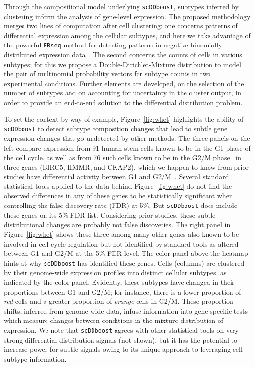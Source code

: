 \documentclass[aoas,preprint]{imsart}
\begin{document}
Through the compositional model underlying \verb+scDDboost+, subtypes inferred by clustering 
inform the analysis of gene-level expression.  The proposed methodology merges two lines of computation
after cell clustering: one concerns patterns of differential expression among 
the cellular subtypes, and here we take advantage of the powerful \verb+EBseq+ method for detecting
patterns in negative-binomially-distributed expression data~\citep{oscope}.  The second concerns 
the counts of cells in various subtypes; for this we propose a Double-Dirichlet-Mixture distribution
to model the pair of multinomial probability vectors for subtype counts in two experimental conditions.
Further elements are developed, on the selection of the number of subtypes and on accounting for uncertainty in the cluster output,  in order to provide an end-to-end solution to the differential distribution
problem.

To set the context by way of example, 
Figure~\ref{fig:whet} highlights the ability of \verb+scDDboost+ to detect subtype composition changes that lead to subtle gene expression changes that go undetected by other methods. 
The three panels on the left compare expression from 91 human 
stem cells known to be in the G1 phase of the cell cycle, as well as
from 76 such cells known to be in the G2/M phase~\citep{ref:Leng} in three genes (BIRC5, HMMR, and CKAP2), which we happen to know from prior studies have differential activity between G1 and G2/M~\citep{BIRC5,HMMR,RAD21}.  
Several standard statistical tools applied to the data behind Figure~\ref{fig:whet} do not find the observed
 differences in any of these genes
to be statistically significant when controlling the false discovery rate (FDR) at 5\%. 
But \verb+scDDboost+ does include these genes on its 5\% FDR list.
Considering prior studies, these subtle distributional changes are probably not false discoveries. 
The right panel in Figure~\ref{fig:whet} shows these three among
  many other genes also known to be involved in cell-cycle regulation but
not identified by standard tools as altered between G1 and G2/M at the 5\% FDR level.    The color panel above the
heatmap hints at why \verb+scDDboost+ has identified these genes. Cells (columns) are clustered by their genome-wide
expression profiles into distinct cellular subtypes, as indicated by the color panel.   Evidently, these 
subtypes have changed in their proportions between G1 and G2/M; for instance, there is a lower proportion
 of {\em red} cells and a greater proportion of {\em orange} cells in G2/M. These proportion shifts, 
inferred from genome-wide data, infuse information into gene-specific tests which measure 
changes between conditions in the mixture distribution of expression.  We note that \verb+scDDboost+ 
agrees with other statistical tools on very strong differential-distribution signals (not shown), but it 
has the potential to increase power for subtle signals owing to its unique approach to leveraging cell subtype
information.
\end{document}
